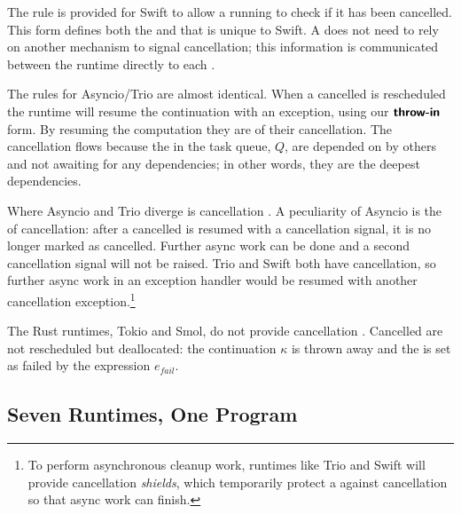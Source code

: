 The  rule is provided for Swift to allow a running \task to check if it has been cancelled. This form defines both the \aware \awareness and \simultaneous \direction that is unique to Swift. A \task does not need to rely on another mechanism to signal cancellation; this information is communicated between the runtime directly to each \task.

The  rules for Asyncio/Trio are almost identical. When a cancelled \task is rescheduled the runtime will resume the continuation with an exception, using our $\text{\normalfont\textsf{\textbf{throw-in}}}$ form. By resuming the computation they are \aware of their cancellation. The cancellation \direction flows \bup because the \tasks in the task queue, $Q$, are depended on by others and not awaiting for any dependencies; in other words, they are the deepest dependencies.


Where Asyncio and Trio diverge is cancellation \persistence. A peculiarity of Asyncio is the \transient \persistence of cancellation: after a cancelled \task is resumed with a cancellation signal, it is no longer marked as cancelled. Further async work can be done and a second cancellation signal will not be raised. Trio and Swift both have \persistent cancellation, so further async work in an exception handler would be resumed with another cancellation exception.\footnote{To perform asynchronous cleanup work, runtimes like Trio and Swift will provide cancellation \emph{shields}, which temporarily protect a \task against cancellation so that async work can finish.}

The Rust runtimes, Tokio and Smol, do not provide cancellation \awareness. Cancelled \tasks are not rescheduled but deallocated: the continuation $\kappa$ is thrown away and the \task is set as failed by the expression $e_{\mathit{fail}}$.

\subsection{Seven Runtimes, One Program}

